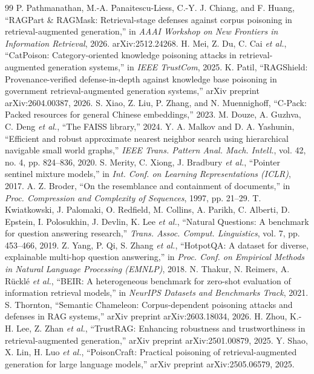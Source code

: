 \documentclass[10pt,journal,compsoc]{IEEEtran}
\begin{document}
\begin{thebibliography}{99}
 P. Pathmanathan, M.-A. Panaitescu-Liess, C.-Y. J. Chiang, and F. Huang, ``RAGPart \& RAGMask: Retrieval-stage defenses against corpus poisoning in retrieval-augmented generation,'' in \emph{AAAI Workshop on New Frontiers in Information Retrieval}, 2026. arXiv:2512.24268.
 H. Mei, Z. Du, C. Cai \emph{et al.}, ``CatPoison: Category-oriented knowledge poisoning attacks in retrieval-augmented generation systems,'' in \emph{IEEE TrustCom}, 2025.
 K. Patil, ``RAGShield: Provenance-verified defense-in-depth against knowledge base poisoning in government retrieval-augmented generation systems,'' arXiv preprint arXiv:2604.00387, 2026.
 S. Xiao, Z. Liu, P. Zhang, and N. Muennighoff, ``C-Pack: Packed resources for general Chinese embeddings,'' 2023.
 M. Douze, A. Guzhva, C. Deng \emph{et al.}, ``The FAISS library,'' 2024.
 Y. A. Malkov and D. A. Yashunin, ``Efficient and robust approximate nearest neighbor search using hierarchical navigable small world graphs,'' \emph{IEEE Trans. Pattern Anal. Mach. Intell.}, vol. 42, no. 4, pp. 824--836, 2020.
 S. Merity, C. Xiong, J. Bradbury \emph{et al.}, ``Pointer sentinel mixture models,'' in \emph{Int. Conf. on Learning Representations (ICLR)}, 2017.
 A. Z. Broder, ``On the resemblance and containment of documents,'' in \emph{Proc. Compression and Complexity of Sequences}, 1997, pp. 21--29.
 T. Kwiatkowski, J. Palomaki, O. Redfield, M. Collins, A. Parikh, C. Alberti, D. Epstein, I. Polosukhin, J. Devlin, K. Lee \emph{et al.}, ``Natural Questions: A benchmark for question answering research,'' \emph{Trans. Assoc. Comput. Linguistics}, vol. 7, pp. 453--466, 2019.
 Z. Yang, P. Qi, S. Zhang \emph{et al.}, ``HotpotQA: A dataset for diverse, explainable multi-hop question answering,'' in \emph{Proc. Conf. on Empirical Methods in Natural Language Processing (EMNLP)}, 2018.
 N. Thakur, N. Reimers, A. R\"{u}ckl\'{e} \emph{et al.}, ``BEIR: A heterogeneous benchmark for zero-shot evaluation of information retrieval models,'' in \emph{NeurIPS Datasets and Benchmarks Track}, 2021.
 S. Thornton, ``Semantic Chameleon: Corpus-dependent poisoning attacks and defenses in RAG systems,'' arXiv preprint arXiv:2603.18034, 2026.
 H. Zhou, K.-H. Lee, Z. Zhan \emph{et al.}, ``TrustRAG: Enhancing robustness and trustworthiness in retrieval-augmented generation,'' arXiv preprint arXiv:2501.00879, 2025.
 Y. Shao, X. Lin, H. Luo \emph{et al.}, ``PoisonCraft: Practical poisoning of retrieval-augmented generation for large language models,'' arXiv preprint arXiv:2505.06579, 2025.

\end{thebibliography}
\end{document}
